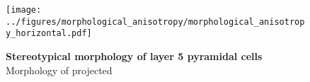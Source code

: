 
\begin{figure}[h]
  \texttt{[image: ../figures/morphological\_anisotropy/morphological\_anisotropy\_horizontal.pdf]} %
\caption{\textbf{Stereotypical morphology of layer 5 pyramidal cells} Morphology of projected \cite{Romand2011} }
\label{fig:stereo_morph}
\end{figure}

